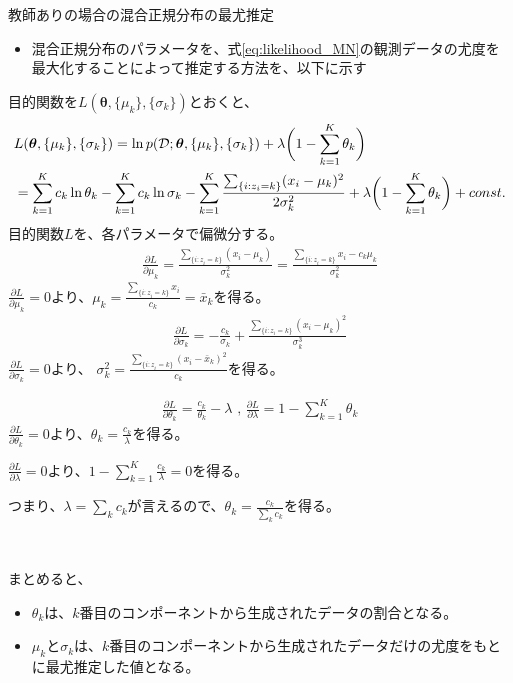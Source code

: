 \documentclass[aspectratio=169,unicode,dvipdfmx,14pt]{beamer}
\begin{document}
\begin{frame}{教師ありの場合の混合正規分布の最尤推定}
\begin{itemize}
\item 混合正規分布のパラメータを、式\eqref{eq:likelihood_MN}の観測データの尤度を最大化することによって推定する方法を、以下に示す
\end{itemize}
\end{frame}


\begin{frame}
\FontMath
\vspace{.1in}
目的関数を$L(\bm{\theta},\{ \mu_k \}, \{ \sigma_k \})$とおくと、
\begin{align}
& L(\bm{\theta},\{ \mu_k \}, \{ \sigma_k \})
= \ln p(\mathcal{D};\bm{\theta},\{ \mu_k \}, \{ \sigma_k \}) 
+ \lambda \bigg( 1 - \sum_{k=1}^K \theta_k \bigg)
\notag \\ &
= \sum_{k=1}^K c_k \ln \theta_k - \sum_{k=1}^K c_k \ln \sigma_k
- \sum_{k=1}^K \frac{\sum_{ \{ i : z_i = k \} } (x_i - \mu_k)^2}{ 2\sigma_k^2} + \lambda \bigg( 1 - \sum_{k=1}^K \theta_k \bigg) + const.
\end{align}
目的関数$L$を、各パラメータで偏微分する。
\begin{align}
\frac{\partial L}{\partial \mu_k} = \frac{ \sum_{ \{ i : z_i = k \} } (x_i - \mu_k) }{\sigma_k^2}
= \frac{ \sum_{ \{ i : z_i = k \} } x_i - c_k \mu_k }{\sigma_k^2}
\end{align}
$\frac{\partial L}{\partial \mu_k} = 0$より、$\mu_k = \frac{ \sum_{ \{ i : z_i = k \} } x_i }{ c_k } = \bar{x}_k$を得る。
\begin{align}
\frac{\partial L}{\partial \sigma_k} = - \frac{c_k}{\sigma_k} + \frac{\sum_{ \{ i : z_i = k \} } (x_i - \mu_k)^2}{ \sigma_k^3}
\end{align}
$\frac{\partial L}{\partial \sigma_k} = 0$より、
$\sigma_k^2 = \frac{\sum_{ \{ i : z_i = k \} } (x_i - \bar{x}_k)^2}{ c_k}$を得る。
\end{frame}

\begin{frame}
\FontMath
\begin{align}
\frac{\partial L}{\partial \theta_k} = \frac{c_k}{\theta_k} - \lambda \mbox{ , \ }
\frac{\partial L}{\partial \lambda} = 1 - \sum_{k=1}^K \theta_k
\end{align}
$\frac{\partial L}{\partial \theta_k} = 0$より、$\theta_k = \frac{c_k}{\lambda}$を得る。

$\frac{\partial L}{\partial \lambda} = 0$より、$1 - \sum_{k=1}^K \frac{c_k}{\lambda} = 0$を得る。

つまり、$\lambda = \sum_k c_k$が言えるので、$\theta_k = \frac{c_k}{\sum_k c_k}$を得る。

\

まとめると、
\begin{itemize}
\item $\theta_k$は、$k$番目のコンポーネントから生成されたデータの割合となる。
\item $\mu_k$と$\sigma_k$は、$k$番目のコンポーネントから生成されたデータだけの尤度をもとに最尤推定した値となる。
\end{itemize}
\end{frame}
\end{document}
